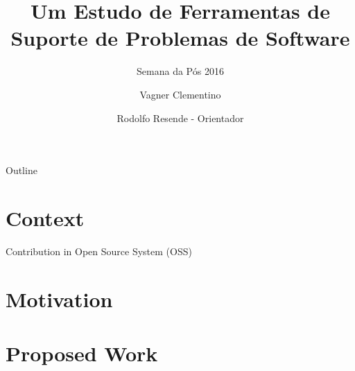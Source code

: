 \documentclass[t,14pt,mathserif]{beamer}
\title[] %
{Um Estudo de Ferramentas de Suporte de Problemas de Software}
\subtitle {Semana da Pós 2016}
\author[] %
{Vagner Clementino%
	\and Rodolfo Resende - Orientador%
	}
\institute[] %
{
  Departamento de Ciência da Computação\\
  Universidade Federal de Minas Gerais(UFMG)\\
  

  }
\date[2016/06/14] %
\begin{document}
\begin{frame}
  \titlepage
\end{frame}

\begin{frame}{Outline}
  \tableofcontents[pausesections]
\end{frame}





\section{Context}

\begin{frame}{Contribution in Open Source System (OSS)}
  
  
	
\end{frame}


\section{Motivation}




\section{Proposed Work}
\end{document}
